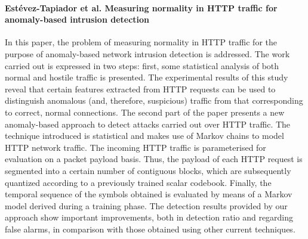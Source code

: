 \paragraph*{Est{\'e}vez-Tapiador et al. Measuring normality in HTTP traffic for anomaly-based intrusion detection}
\cite{estevez2004measuring}
In this paper, the problem of measuring normality in HTTP traffic for the purpose of anomaly-based network intrusion detection is addressed. The work carried out is expressed in two steps: first, some statistical analysis of both normal and hostile traffic is presented. The experimental results of this study reveal that certain features extracted from HTTP requests can be used to distinguish anomalous (and, therefore, suspicious) traffic from that corresponding to correct, normal connections. The second part of the paper presents a new anomaly-based approach to detect attacks carried out over HTTP traffic. The technique introduced is statistical and makes use of Markov chains to model HTTP network traffic. The incoming HTTP traffic is parameterised for evaluation on a packet payload basis. Thus, the payload of each HTTP request is segmented into a certain number of contiguous blocks, which are subsequently quantized according to a previously trained scalar codebook. Finally, the temporal sequence of the symbols obtained is evaluated by means of a Markov model derived during a training phase. The detection results provided by our approach show important improvements, both in detection ratio and regarding false alarms, in comparison with those obtained using other current techniques.

